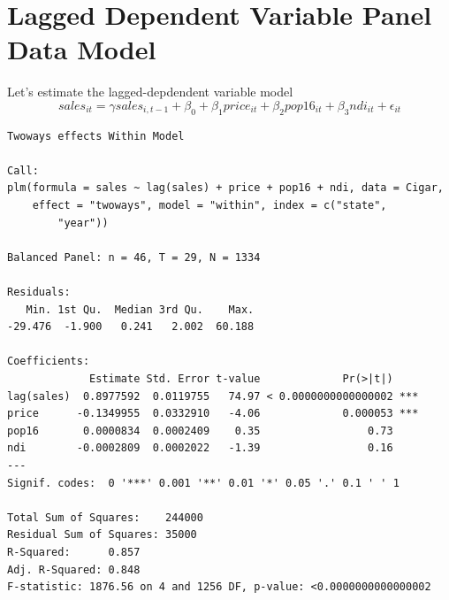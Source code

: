\documentclass[]{book}
\newenvironment{Shaded}{\begin{snugshade}}{\end{snugshade}}
\newcommand{\CommentTok}[1]{\textcolor[rgb]{0.56,0.35,0.01}{\textit{#1}}}
\newcommand{\DataTypeTok}[1]{\textcolor[rgb]{0.13,0.29,0.53}{#1}}
\newcommand{\KeywordTok}[1]{\textcolor[rgb]{0.13,0.29,0.53}{\textbf{#1}}}
\newcommand{\NormalTok}[1]{#1}
\newcommand{\OperatorTok}[1]{\textcolor[rgb]{0.81,0.36,0.00}{\textbf{#1}}}
\newcommand{\StringTok}[1]{\textcolor[rgb]{0.31,0.60,0.02}{#1}}
\begin{document}
\hypertarget{lagged-dependent-variable-panel-data-model}{%
\section{Lagged Dependent Variable Panel Data Model}\label{lagged-dependent-variable-panel-data-model}}

Let's estimate the lagged-depdendent variable model \[sales_{it} = \gamma sales_{i,t-1}+\beta_0+\beta_1price_{it}+\beta_2pop16_{it}+\beta_3ndi_{it}+\epsilon_{it}\]

\begin{Shaded}
\end{Shaded}

\begin{verbatim}
Twoways effects Within Model

Call:
plm(formula = sales ~ lag(sales) + price + pop16 + ndi, data = Cigar, 
    effect = "twoways", model = "within", index = c("state", 
        "year"))

Balanced Panel: n = 46, T = 29, N = 1334

Residuals:
   Min. 1st Qu.  Median 3rd Qu.    Max. 
-29.476  -1.900   0.241   2.002  60.188 

Coefficients:
             Estimate Std. Error t-value             Pr(>|t|)    
lag(sales)  0.8977592  0.0119755   74.97 < 0.0000000000000002 ***
price      -0.1349955  0.0332910   -4.06             0.000053 ***
pop16       0.0000834  0.0002409    0.35                 0.73    
ndi        -0.0002809  0.0002022   -1.39                 0.16    
---
Signif. codes:  0 '***' 0.001 '**' 0.01 '*' 0.05 '.' 0.1 ' ' 1

Total Sum of Squares:    244000
Residual Sum of Squares: 35000
R-Squared:      0.857
Adj. R-Squared: 0.848
F-statistic: 1876.56 on 4 and 1256 DF, p-value: <0.0000000000000002
\end{verbatim}
\end{document}
